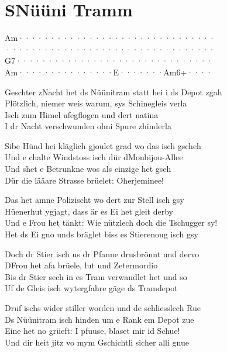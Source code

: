 \documentclass[
  letterpaper,
]{scrbook}
\begin{document}
\hypertarget{snuxfcuxfcni-tramm}{%
\chapter{S\textquotesingle Nüüni Tramm}\label{snuxfcuxfcni-tramm}}

\textbar Am·······\textbar········\textbar········\textbar········\textbar{}\\
\textbar·········\textbar········\textbar········\textbar········\textbar{}\\
\textbar G7·······\textbar········\textbar········\textbar········\textbar{}\\
\textbar Am·······\textbar········\textbar E·······\textbar Am6+····\textbar{}

Geschter z\textquotesingle Nacht het ds Nüünitram statt hei i ds Depot
z\textquotesingle gah\\
Plötzlich, niemer weis warum, sys Schinegleis verla\\
Isch zum Himel ufegflogen und dert natina\\
I dr Nacht verschwunden ohni Spure z\textquotesingle hinderla

Sibe Hünd hei kläglich gjoulet grad wo das isch gscheh\\
Und e chalte Windstoss isch dür d\textquotesingle Monbijou-Allee\\
Und s\textquotesingle het e Betrunkne wos als einzige het gseh\\
Dür die lääare Strasse brüelet: Oherjeminee!

Das het amne Polizischt wo dert zur Stell isch gsy\\
Hüenerhut ygjagt, dass är es Ei het gleit derby\\
Und e Frou het tänkt: Wie nützlech doch die Tschugger sy!\\
Het ds Ei gno und\textquotesingle s bräglet bis\textquotesingle s es
Stierenoug isch gsy

Doch dr Stier isch us dr Pfanne drusbrönnt und dervo\\
D\textquotesingle Frou het afa brüele, lut und Zetermordio\\
Bis dr Stier sech in es Tram verwandlet het und so\\
Uf de Gleis isch wytergfahre gäge ds Tramdepot

Druf ischs wider stiller worden und de schliesslech Rue\\
Ds Nüünitram isch hinden um e Rank em Depot zue\\
Eine het no grüeft: I pfuuse, blaset mir id Schue!\\
Und dir heit jitz vo mym Gschichtli sicher alli gnue
\end{document}
